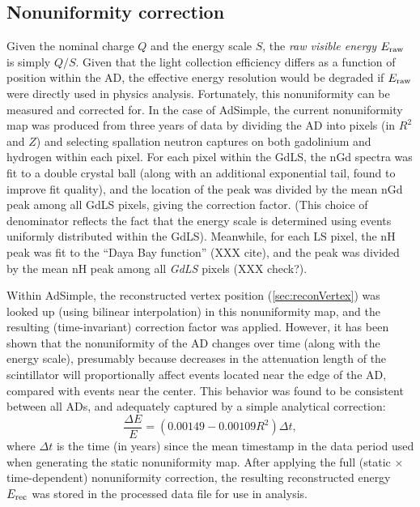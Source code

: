 \documentclass[../thesis.tex]{subfiles}
\begin{document}
\subsection{Nonuniformity correction}
\label{sec:reconEnergyNU}

Given the nominal charge $Q$ and the energy scale $S$, the \emph{raw visible energy} $E_\mathrm{raw}$ is simply $Q/S$. Given that the light collection efficiency differs as a function of position within the AD, the effective energy resolution would be degraded if $E_\mathrm{raw}$ were directly used in physics analysis. Fortunately, this nonuniformity can be measured and corrected for. In the case of AdSimple, the current nonuniformity map was produced from three years of data by dividing the AD into pixels (in $R^2$ and $Z$) and selecting spallation neutron captures on both gadolinium and hydrogen within each pixel. For each pixel within the GdLS, the nGd spectra was fit to a double crystal ball (along with an additional exponential tail, found to improve fit quality), and the location of the peak was divided by the mean nGd peak among all GdLS pixels, giving the correction factor. (This choice of denominator reflects the fact that the energy scale is determined using events uniformly distributed within the GdLS). Meanwhile, for each LS pixel, the nH peak was fit to the ``Daya Bay function'' (XXX cite), and the peak was divided by the mean nH peak among all \emph{GdLS} pixels (XXX check?).

Within AdSimple, the reconstructed vertex position (\autoref{sec:reconVertex}) was looked up (using bilinear interpolation) in this nonuniformity map, and the resulting (time-invariant) correction factor was applied. However, it has been shown that the nonuniformity of the AD changes over time (along with the energy scale), presumably because decreases in the attenuation length of the scintillator will proportionally affect events located near the edge of the AD, compared with events near the center. This behavior was found to be consistent between all ADs, and adequately captured by a simple analytical correction:
\begin{equation*}
  \frac{\Delta E}{E} = (0.00149 - 0.00109 R^2) \Delta t,
\end{equation*}
where $\Delta t$ is the time (in years) since the mean timestamp in the data period used when generating the static nonuniformity map. After applying the full (static $\times$ time-dependent) nonuniformity correction, the resulting reconstructed energy $E_\mathrm{rec}$ was stored in the processed data file for use in analysis.
\end{document}
